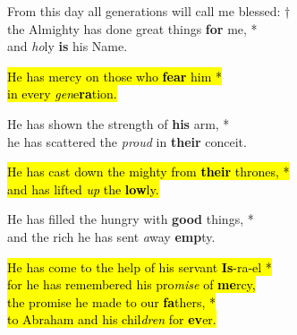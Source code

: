
From this day all generations will call me blessed: †\\
the Almighty has done great things \textbf{for} me, *\\
and \emph{ho}ly \textbf{is} his Name.

\hl{He has mercy on those who \textbf{fear} him *\\
in every \emph{gen}e\textbf{ra}tion.}

He has shown the strength of \textbf{his} arm, *\\
he has scattered the \emph{proud} in \textbf{their} conceit.

\hl{He has cast down the mighty from \textbf{their} thrones, *\\
and has lifted \emph{up} the \textbf{low}ly.}

He has filled the hungry with \textbf{good} things, *\\
and the rich he has sent \emph{a}way \textbf{emp}ty.

\hl{He has come to the help of his servant \textbf{Is}-ra-el *\\
for he has remembered his pro\emph{mise} of \textbf{me}rcy,\\
the promise he made to our \textbf{fa}thers, *\\
to Abraham and his chil\emph{dren} for \textbf{ev}er.}
